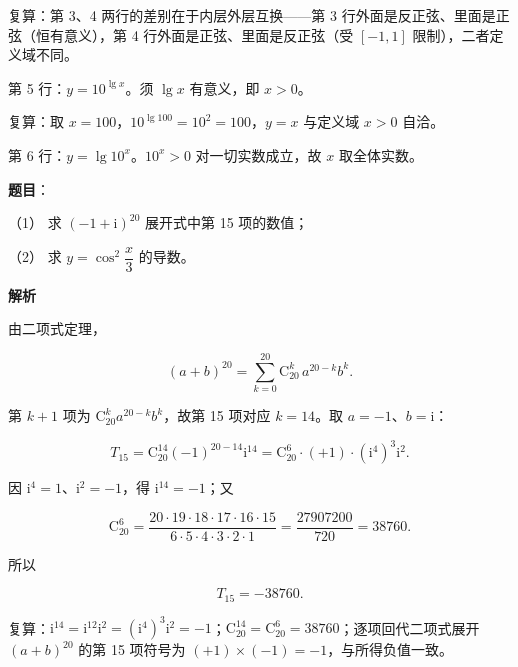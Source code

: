 \begin{answer}
复算：第 3、4 两行的差别在于内层外层互换——第 3 行外面是反正弦、里面是正弦（恒有意义），第 4 行外面是正弦、里面是反正弦（受 $[-1,1]$ 限制），二者定义域不同。

第 5 行：$y=10^{\lg x}$。须 $\lg x$ 有意义，即 $x>0$。

复算：取 $x=100$，$10^{\lg100}=10^2=100$，$y=x$ 与定义域 $x>0$ 自洽。

第 6 行：$y=\lg 10^x$。$10^x>0$ 对一切实数成立，故 $x$ 取全体实数。


\end{answer}
\begin{answer}

\textbf{题目}：

（1） 求 $(-1+\mathrm i)^{20}$ 展开式中第 15 项的数值；

（2） 求 $y=\cos^2\dfrac{x}{3}$ 的导数。

\textbf{解析}


由二项式定理，

\nopagebreak[4]
\[
(a+b)^{20}=\sum_{k=0}^{20}\mathrm{C}_{20}^{k}\,a^{20-k}b^{k}.
\]

第 $k+1$ 项为 $\mathrm{C}_{20}^{k}a^{20-k}b^{k}$，故第 15 项对应 $k=14$。取 $a=-1$、$b=\mathrm i$：

\nopagebreak[4]
\[
T_{15}=\mathrm{C}_{20}^{14}(-1)^{20-14}\mathrm i^{14}
=\mathrm{C}_{20}^{6}\cdot(+1)\cdot(\mathrm i^4)^3\mathrm i^2.
\]

因 $\mathrm i^4=1$、$\mathrm i^2=-1$，得 $\mathrm i^{14}=-1$；又

\nopagebreak[4]
\[
\mathrm{C}_{20}^{6}=\frac{20\cdot19\cdot18\cdot17\cdot16\cdot15}{6\cdot5\cdot4\cdot3\cdot2\cdot1}=\frac{27907200}{720}=38760.
\]

所以

\nopagebreak[4]
\[
T_{15}=-38760.
\]

复算：$\mathrm i^{14}=\mathrm i^{12}\mathrm i^2=(\mathrm i^4)^3\mathrm i^2=-1$；$\mathrm{C}_{20}^{14}=\mathrm{C}_{20}^{6}=38760$；逐项回代二项式展开 $(a+b)^{20}$ 的第 15 项符号为 $(+1)\times(-1)=-1$，与所得负值一致。



\end{answer}
